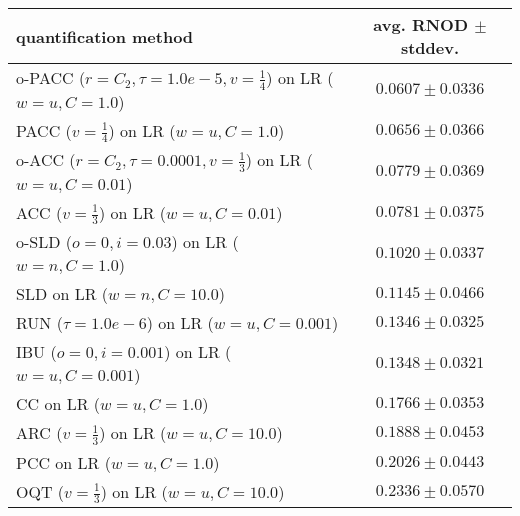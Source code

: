 \begin{tabular}{lc}
  \toprule
  quantification method & avg. RNOD $\pm$ stddev. \\
  \midrule
  o-PACC ($r=C_2, \tau=1.0e-5, v=\frac{1}{4}$) on LR ($w=u, C=1.0$) & $\mathbf{0.0607 \pm 0.0336}$ \\
  PACC ($v=\frac{1}{4}$) on LR ($w=u, C=1.0$) & $0.0656 \pm 0.0366$ \\
  o-ACC ($r=C_2, \tau=0.0001, v=\frac{1}{3}$) on LR ($w=u, C=0.01$) & $0.0779 \pm 0.0369$ \\
  ACC ($v=\frac{1}{3}$) on LR ($w=u, C=0.01$) & $0.0781 \pm 0.0375$ \\
  o-SLD ($o=0, i=0.03$) on LR ($w=n, C=1.0$) & $0.1020 \pm 0.0337$ \\
  SLD on LR ($w=n, C=10.0$) & $0.1145 \pm 0.0466$ \\
  RUN ($\tau=1.0e-6$) on LR ($w=u, C=0.001$) & $0.1346 \pm 0.0325$ \\
  IBU ($o=0, i=0.001$) on LR ($w=u, C=0.001$) & $0.1348 \pm 0.0321$ \\
  CC on LR ($w=u, C=1.0$) & $0.1766 \pm 0.0353$ \\
  ARC ($v=\frac{1}{3}$) on LR ($w=u, C=10.0$) & $0.1888 \pm 0.0453$ \\
  PCC on LR ($w=u, C=1.0$) & $0.2026 \pm 0.0443$ \\
  OQT ($v=\frac{1}{3}$) on LR ($w=u, C=10.0$) & $0.2336 \pm 0.0570$ \\
  \bottomrule
\end{tabular}
